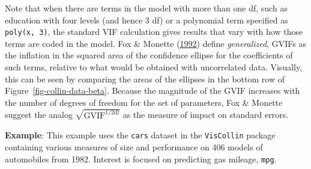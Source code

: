 \documentclass[
  letterpaper,
  10pt,
  krantz2]{krantz}
\makeatletter
\newenvironment{Shaded}{\begin{snugshade}}{\end{snugshade}}
\newcommand{\AttributeTok}[1]{\textcolor[rgb]{0.40,0.45,0.13}{#1}}
\newcommand{\CommentTok}[1]{\textcolor[rgb]{0.37,0.37,0.37}{#1}}
\newcommand{\FunctionTok}[1]{\textcolor[rgb]{0.28,0.35,0.67}{#1}}
\newcommand{\NormalTok}[1]{\textcolor[rgb]{0.00,0.23,0.31}{#1}}
\newcommand{\StringTok}[1]{\textcolor[rgb]{0.13,0.47,0.30}{#1}}
\newenvironment{kframe}{%
  \medskip{}
  \setlength{\fboxsep}{.8em}
  \def\at@end@of@kframe{}%
  \ifinner\ifhmode%
  \def\at@end@of@kframe{\end{minipage}}%
  \begin{minipage}{\columnwidth}%
  \fi\fi%
  \def\FrameCommand##1{\hskip\@totalleftmargin \hskip-\fboxsep
  \colorbox{shadecolor}{##1}\hskip-\fboxsep
      \hskip-\linewidth \hskip-\@totalleftmargin \hskip\columnwidth}%
  \MakeFramed {\advance\hsize-\width
    \@totalleftmargin\z@ \linewidth\hsize
    \@setminipage}}%
{\par\unskip\endMakeFramed%
  \at@end@of@kframe}
\renewenvironment{Shaded}{\begin{kframe}}{\end{kframe}}
\makeatother
\begin{document}
Note that when there are terms in the model with more than one df, such
as education with four levels (and hence 3 df) or a polynomial term
specified as \texttt{poly(x,\ 3)}, the standard VIF calculation gives
results that vary with how those terms are coded in the model. Fox \&
Monette (\protect\hyperlink{ref-FoxMonette:92}{1992}) define
\emph{generalized}, GVIFs as the inflation in the squared area of the
confidence ellipse for the coefficients of such terms, relative to what
would be obtained with uncorrelated data. Visually, this can be seen by
comparing the areas of the ellipses in the bottom row of
Figure~\ref{fig-collin-data-beta}. Because the magnitude of the GVIF
increases with the number of degrees of freedom for the set of
parameters, Fox \& Monette suggest the analog
\(\sqrt{\text{GVIF}^{1/2 \text{df}}}\) as the measure of impact on
standard errors.

\textbf{Example}: This example uses the \texttt{cars} dataset in the
\texttt{VisCollin} package containing various measures of size and
performance on 406 models of automobiles from 1982. Interest is focused
on predicting gas mileage, \texttt{mpg}.

\begin{Shaded}
\end{Shaded}
\end{document}
